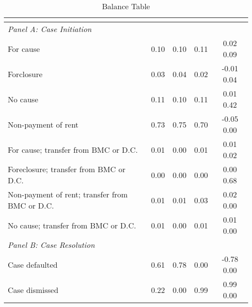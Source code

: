 \begin{table}[htbp]\centering
\def\sym#1{\ifmmode^{#1}\else\(^{#1}\)\fi}
\caption{Balance Table}
\begin{tabular}{l*{4}{c}}
\toprule
                    &&&&\\
\midrule
\emph{Panel A: Case Initiation}&            &            &            &            \\
\hspace{0.25cm}For cause&      0.10  &      0.10  &      0.11  &   0.02 0.09\\
\hspace{0.25cm}Forclosure&      0.03  &      0.04  &      0.02  &  -0.01 0.04\\
\hspace{0.25cm}No cause&      0.11  &      0.10  &      0.11  &   0.01 0.42\\
\hspace{0.25cm}Non-payment of rent&      0.73  &      0.75  &      0.70  &  -0.05 0.00\\
\hspace{0.25cm}For cause; transfer from BMC or D.C.&      0.01  &      0.00  &      0.01  &   0.01 0.02\\
\hspace{0.25cm}Foreclosure; transfer from BMC or D.C.&      0.00  &      0.00  &      0.00  &   0.00 0.68\\
\hspace{0.25cm}Non-payment of rent; transfer from BMC or D.C.&      0.01  &      0.01  &      0.03  &   0.02 0.00\\
\hspace{0.25cm}No cause; transfer from BMC or D.C.&      0.01  &      0.00  &      0.01  &   0.01 0.00\\
\emph{Panel B: Case Resolution}&            &            &            &            \\
\hspace{0.25cm}Case defaulted&      0.61  &      0.78  &      0.00  &  -0.78 0.00\\
\hspace{0.25cm}Case dismissed&      0.22  &      0.00  &      0.99  &   0.99 0.00\\

\end{tabular}
\end{table}
